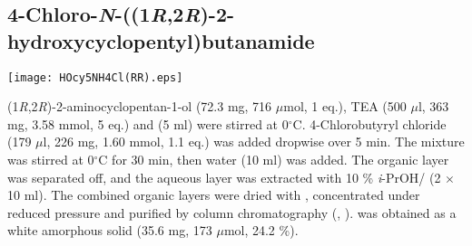\subsection{4\hyp{}Chloro\hyp{}\textit{N}\hyp{}((1\textit{R},2\textit{R})\hyp{}2\hyp{}hydroxycyclopentyl)butanamide }


\begin{scheme}[H]
	\begin{center}
		\texttt{[image: HOcy5NH4Cl(RR).eps]}
	\end{center}
\end{scheme}

(1\textit{R},2\textit{R})\hyp{}2\hyp{}aminocyclopentan\hyp{}1\hyp{}ol  (72.3 mg, 716 $\mu$mol, 1 eq.), TEA (500 $\mu$l, 363 mg, 3.58 mmol, 5 eq.) and  (5 ml) were stirred at 0$^\circ$C. 4-Chlorobutyryl chloride (179 $\mu$l, 226 mg, 1.60 mmol, 1.1 eq.) was added dropwise over 5 min. The mixture was stirred at 0$^\circ$C for 30 min, then water (10 ml) was added. The organic layer was separated off, and the aqueous layer was extracted with 10 \% \textit{i}-PrOH/ (2 $\times$ 10 ml). The combined organic layers were dried with , concentrated under reduced pressure and purified by column chromatography (, ).  was obtained as a white amorphous solid (35.6 mg, 173 $\mu$mol, 24.2 \%).%
\\[1\baselineskip]
\\[1\baselineskip]
\\[1\baselineskip]
